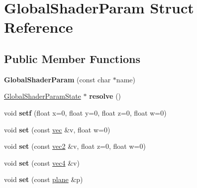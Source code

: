 \hypertarget{struct_global_shader_param}{}\section{Global\+Shader\+Param Struct Reference}
\label{struct_global_shader_param}
\subsection*{Public Member Functions}
\begin{DoxyCompactItemize}
\item 
\mbox{\label{struct_global_shader_param_a9589e84e6b49aebf477d522900abcd9b}} 
{\bfseries Global\+Shader\+Param} (const char $\ast$name)
\item 
\mbox{\label{struct_global_shader_param_aca4cc5b8c5ba8870c6b16efc8ec8a496}} 
\hyperlink{struct_global_shader_param_state}{Global\+Shader\+Param\+State} $\ast$ {\bfseries resolve} ()
\item 
\mbox{\label{struct_global_shader_param_a3b184cc9892632f420c94db694ad5e1d}} 
void {\bfseries setf} (float x=0, float y=0, float z=0, float w=0)
\item 
\mbox{\label{struct_global_shader_param_a59d4a5da4a87789b07d3bcdae3595fb8}} 
void {\bfseries set} (const \hyperlink{structvec}{vec} \&v, float w=0)
\item 
\mbox{\label{struct_global_shader_param_a80b256c46992588d6d5ccafe65856a18}} 
void {\bfseries set} (const \hyperlink{structvec2}{vec2} \&v, float z=0, float w=0)
\item 
\mbox{\label{struct_global_shader_param_aa06845a3e668d37fca071368918accf5}} 
void {\bfseries set} (const \hyperlink{structvec4}{vec4} \&v)
\item 
\mbox{\label{struct_global_shader_param_a07b68d7e854594062ff1cd678abff846}} 
void {\bfseries set} (const \hyperlink{structplane}{plane} \&p)
\item 
\mbox{\label{struct_global_shader_param_a6a1a9575032a473ec5f233b48fa14012}} 

\end{DoxyCompactItemize}
